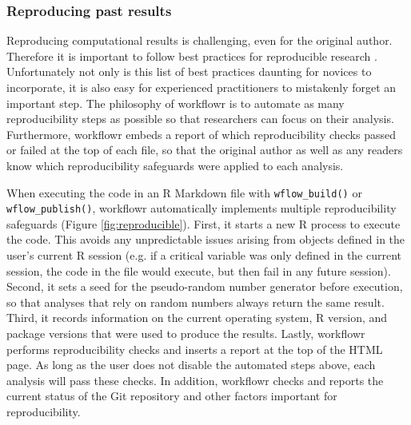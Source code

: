 \documentclass[9pt,a4paper]{extarticle}
\begin{document}
\subsubsection*{Reproducing past results}

Reproducing computational results is challenging, even for the original
author. Therefore it is important to follow best practices for
reproducible research \cite{Sandve2013, Wilson2014a, Wilson2017}.
Unfortunately not only is this list of best practices daunting for
novices to incorporate, it is also easy for experienced practitioners to
mistakenly forget an important step. The philosophy of workflowr is to
automate as many reproducibility steps as possible so that researchers
can focus on their analysis. Furthermore, workflowr embeds a report of
which reproducibility checks passed or failed at the top of each file,
so that the original author as well as any readers know which
reproducibility safeguards were applied to each analysis.

When executing the code in an R Markdown file with \verb|wflow_build()| or
\verb|wflow_publish()|, workflowr automatically implements multiple
reproducibility safeguards (Figure \ref{fig:reproducible}). First, it starts a new R process
to execute the code. This avoids any unpredictable issues arising from
objects defined in the user’s current R session (e.g. if a critical
variable was only defined in the current session, the code in the file
would execute, but then fail in any future session). Second, it sets a
seed for the pseudo-random number generator before execution, so that
analyses that rely on random numbers always return the same result.
Third, it records information on the current operating system, R
version, and package versions that were used to produce the results.
Lastly, workflowr performs reproducibility checks and inserts a report
at the top of the HTML page. As long as the user does not disable the
automated steps above, each analysis will pass these checks. In
addition, workflowr checks and reports the current status of the Git
repository and other factors important for reproducibility.
\end{document}
